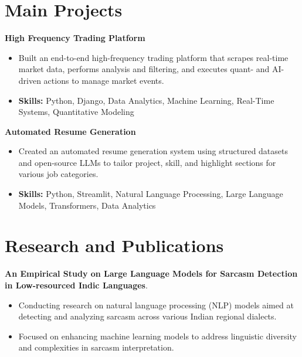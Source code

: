 \documentclass[a4paper,11pt]{article}
\begin{document}
\section{\textbf{Main Projects}}

\vspace{1mm}
  \textbf{High Frequency Trading Platform  }
\vspace{-1.5mm} %
\begin{itemize}
  \item Built an end-to-end high-frequency trading platform that scrapes real-time market data, performs analysis and filtering, and executes quant- and AI-driven actions to manage market events.
\vspace{-3mm}
  \item \textbf{Skills:} Python, Django, Data Analytics, Machine Learning, Real-Time Systems, Quantitative Modeling
\end{itemize}


\vspace{1mm}
   \textbf{Automated Resume Generation }
\vspace{-1.5mm} %
\begin{itemize}
  \item Created an automated resume generation system using structured datasets and open-source LLMs to tailor project, skill, and highlight sections for various job categories.
\vspace{-3mm}
  \item \textbf{Skills:} Python, Streamlit, Natural Language Processing, Large Language Models, Transformers, Data Analytics
\end{itemize}



\section{\textbf{Research and Publications} \hfill }
\vspace{1mm}
  \textbf{An Empirical Study on Large Language Models for Sarcasm Detection in Low-resourced Indic Languages}.
\vspace{-1mm} %
\begin{itemize}
  \item Conducting research on natural language processing (NLP) models aimed at detecting and analyzing sarcasm across various Indian regional dialects.
\vspace{-3mm}
  \item Focused on enhancing machine learning models to address linguistic diversity and complexities in sarcasm interpretation.
\end{itemize}
\end{document}
